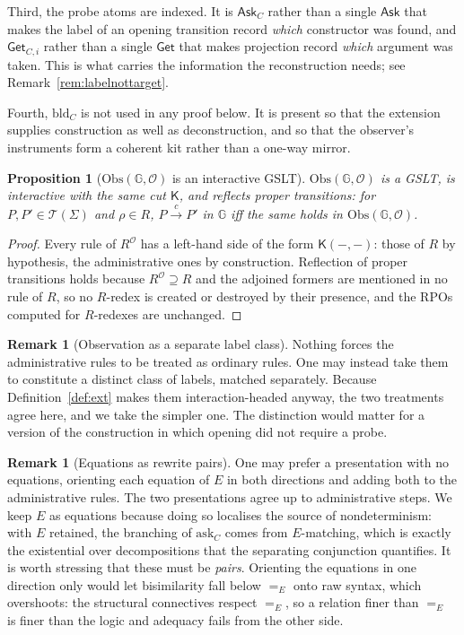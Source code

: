 \documentclass[11pt]{article}
\theoremstyle{plain}
\newtheorem{proposition}[theorem]{Proposition}
\theoremstyle{definition}
\newtheorem{remark}[theorem]{Remark}
\newcommand{\Kc}{\mathsf{K}}
\newcommand{\Gg}{\mathbb{G}}
\newcommand{\Obs}{\mathrm{Obs}}
\newcommand{\Ask}{\mathsf{Ask}}
\newcommand{\Get}{\mathsf{Get}}
\newcommand{\Terms}{\mathcal{T}}
\newcommand{\Ob}{\mathcal{O}}
\begin{document}
Third, the probe atoms are indexed. It is $\Ask_C$ rather than a single $\Ask$ that makes the label of
an opening transition record \emph{which} constructor was found, and $\Get_{C,i}$ rather than a single
$\Get$ that makes projection record \emph{which} argument was taken. This is what carries the
information the reconstruction needs; see Remark~\ref{rem:labelnottarget}.

Fourth, $\mathrm{bld}_C$ is not used in any proof below. It is present so that the extension supplies
construction as well as deconstruction, and so that the observer's instruments form a coherent kit
rather than a one-way mirror.

\begin{proposition}[$\Obs(\Gg,\Ob)$ is an interactive GSLT]
\label{prop:still}
$\Obs(\Gg,\Ob)$ is a GSLT, is interactive with the same cut $\Kc$, and reflects proper transitions: for
$P,P' \in \Terms(\Sigma)$ and $\rho \in R$, $P \xrightarrow{c} P'$ in $\Gg$ iff the same holds in
$\Obs(\Gg,\Ob)$.
\end{proposition}

\begin{proof}
Every rule of $R^\Ob$ has a left-hand side of the form $\Kc(-,-)$: those of $R$ by hypothesis, the
administrative ones by construction. Reflection of proper transitions holds because $R^\Ob \supseteq R$
and the adjoined formers are mentioned in no rule of $R$, so no $R$-redex is created or destroyed by
their presence, and the RPOs computed for $R$-redexes are unchanged.
\end{proof}

\begin{remark}[Observation as a separate label class]
Nothing forces the administrative rules to be treated as ordinary rules. One may instead take them to
constitute a distinct class of labels, matched separately. Because Definition~\ref{def:ext} makes them
interaction-headed anyway, the two treatments agree here, and we take the simpler one. The distinction
would matter for a version of the construction in which opening did not require a probe.
\end{remark}

\begin{remark}[Equations as rewrite pairs]
\label{rem:pairs}
One may prefer a presentation with no equations, orienting each equation of $E$ in both directions and
adding both to the administrative rules. The two presentations agree up to administrative steps. We
keep $E$ as equations because doing so localises the source of nondeterminism: with $E$ retained, the
branching of $\mathrm{ask}_C$ comes from $E$-matching, which is exactly the existential over
decompositions that the separating conjunction quantifies. It is worth stressing that these must be
\emph{pairs}. Orienting the equations in one direction only would let bisimilarity fall below $=_E$ onto
raw syntax, which overshoots: the structural connectives respect $=_E$, so a relation finer than $=_E$
is finer than the logic and adequacy fails from the other side.
\end{remark}
\end{document}
